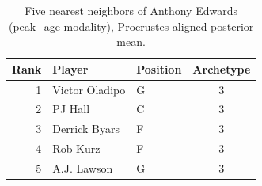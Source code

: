 \begin{table}[htbp]
  \centering\small
  \begin{tabular}{rllc}
    \toprule
    Rank & Player & Position & Archetype \\
    \midrule
    1 & Victor Oladipo & G & 3 \\
    2 & PJ Hall & C & 3 \\
    3 & Derrick Byars & F & 3 \\
    4 & Rob Kurz & F & 3 \\
    5 & A.J. Lawson & G & 3 \\
    \bottomrule
  \end{tabular}
  \caption{Five nearest neighbors of Anthony Edwards (peak_age modality), Procrustes-aligned posterior mean.}
  \label{tab:Anthony_Edwards_neighbors_peak_age}
\end{table}

